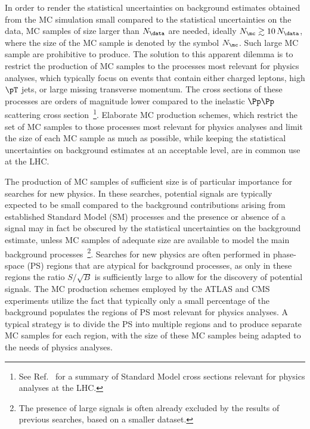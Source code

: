 In order to render the statistical uncertainties on background estimates obtained from the MC simulation small compared to the statistical uncertainties on the data,
MC samples of size larger than $N_{\data}$ are needed, ideally $N_{\mc} \gtrsim 10 \, N_{\data}$,
where the size of the MC sample is denoted by the symbol $N_{\mc}$.
Such large MC sample are prohibitive to produce.
The solution to this apparent dilemma is to restrict the production of MC samples to the processes most relevant for physics analyses,
which typically focus on events that contain either charged leptons, high $\pT$ jets, or large missing transverse momentum.
The cross sections of these processes are orders of magnitude lower compared to the inelastic $\Pp\Pp$ scattering cross section~\footnote{ 
See Ref.~\cite{StandardModelCrossSections} for a summary of Standard Model cross sections relevant for physics analyses at the LHC.}.
Elaborate MC production schemes,
which restrict the set of MC samples to those processes most relevant for physics analyses
and limit the size of each MC sample as much as possible, 
while keeping the statistical uncertainties on background estimates at an acceptable level,
are in common use at the LHC.

The production of MC samples of sufficient size is of particular importance for searches for new physics.
In these searches, potential signals are typically expected to be small
compared to the background contributions arising from established Standard Model (SM) processes
and the presence or absence of a signal may in fact be obscured by the statistical uncertainties on the background estimate,
unless MC samples of adequate size are available to model the main background processes~\footnote{
The presence of large signals is often already excluded by the results of previous searches, based on a smaller dataset.}.
Searches for new physics are often performed in phase-space (PS) regions that are atypical for background processes,
as only in these regions the ratio $S/\sqrt{B}$ is sufficiently large to allow for the discovery of potential signals.
The MC production schemes employed by the ATLAS and CMS experiments utilize the fact 
that typically only a small percentage of the background populates the regions of PS most relevant for physics analyses.
A typical strategy is to divide the PS into multiple regions and to produce separate MC samples for each region,
with the size of these MC samples being adapted to the needs of physics analyses.

